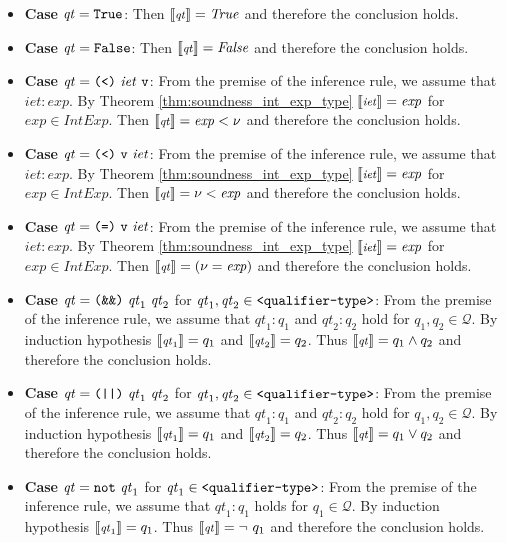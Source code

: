 \documentclass[]{scrbook}
\newcommand{\mf}[1]{\text{\texttt{#1}}}
\newcommand{\semantic}[1]{\llbracket \text{\footnotesize\texttt{#1}} \rrbracket}
\theoremstyle{definition}
\theoremstyle{definition}
\theoremstyle{definition}
\theoremstyle{remark}
\begin{document}
\begin{itemize}
    \item \textbf{Case} $\mathit{qt} = \mf{True}$: Then $\semantic{$\mathit{qt}$} = \mathit{True}$ and therefore the conclusion holds.
    \item \textbf{Case} $\mathit{qt} = \mf{False}$: Then $\semantic{$\mathit{qt}$} = \mathit{False}$ and therefore the conclusion holds.
    \item \textbf{Case} $\mathit{qt} = \mf{(<)} \ \mathit{iet} \ \mf{v}$: From the premise of the inference rule, we assume that $\mathit{iet}:\mathit{exp}$. By Theorem \ref{thm:soundness_int_exp_type} $\semantic{$\mathit{iet}$} = \mathit{exp}$ for $\mathit{exp}\in\mathit{IntExp}$. Then $\semantic{$\mathit{qt}$} = \mathit{exp} < \nu$ and therefore the conclusion holds.
    \item \textbf{Case} $\mathit{qt} = \mf{(<)} \ \mf{v} \ \mathit{iet} $: From the premise of the inference rule, we assume that $\mathit{iet}:\mathit{exp}$. By Theorem \ref{thm:soundness_int_exp_type} $\semantic{$\mathit{iet}$} = \mathit{exp}$ for $\mathit{exp}\in\mathit{IntExp}$. Then $\semantic{$\mathit{qt}$} = \nu < \mathit{exp}$ and therefore the conclusion holds.
    \item \textbf{Case} $\mathit{qt} = \mf{(=)} \ \mf{v} \ \mathit{iet} $: From the premise of the inference rule, we assume that $\mathit{iet}:\mathit{exp}$. By Theorem \ref{thm:soundness_int_exp_type} $\semantic{$\mathit{iet}$} = \mathit{exp}$ for $\mathit{exp}\in\mathit{IntExp}$. Then $\semantic{$\mathit{qt}$} = (\nu = \mathit{exp})$ and therefore the conclusion holds.
    \item \textbf{Case} $\mathit{qt} = \mf{(\&\&)}\ \mathit{qt}_1 \ \mathit{qt}_2$ for $\mathit{qt}_1,\mathit{qt}_2 \in \mf{<qualifier-type>}$: From the premise of the inference rule, we assume that $\mathit{qt}_1:q_1$ and $\mathit{qt}_2:q_2$ hold for $q_1,q_2\in\mathcal{Q}$. By induction hypothesis $\semantic{$\mathit{qt}_1$} = q_1$ and $\semantic{$\mathit{qt}_2$} = q_2$. Thus $\semantic{$\mathit{qt}$} = q_1 \land q_2$ and therefore the conclusion holds.
    \item \textbf{Case} $\mathit{qt} = \mf{(||)}\ \mathit{qt}_1 \ \mathit{qt}_2$ for $\mathit{qt}_1,\mathit{qt}_2 \in \mf{<qualifier-type>}$: From the premise of the inference rule, we assume that $\mathit{qt}_1:q_1$ and $\mathit{qt}_2:q_2$ hold for $q_1,q_2\in\mathcal{Q}$. By induction hypothesis $\semantic{$\mathit{qt}_1$} = q_1$ and $\semantic{$\mathit{qt}_2$} = q_2$. Thus $\semantic{$\mathit{qt}$} = q_1 \lor q_2$ and therefore the conclusion holds.
    \item \textbf{Case} $\mathit{qt} = \mf{not} \ \mathit{qt}_1$ for $\mathit{qt}_1\in\mf{<qualifier-type>}$: From the premise of the inference rule, we assume that $\mathit{qt}_1:q_1$ holds for $q_1\in\mathcal{Q}$. By induction hypothesis $\semantic{$\mathit{qt}_1$} = q_1$. Thus $\semantic{$\mathit{qt}$} = \neg \ q_1$ and therefore the conclusion holds.
\end{itemize}
\end{document}
